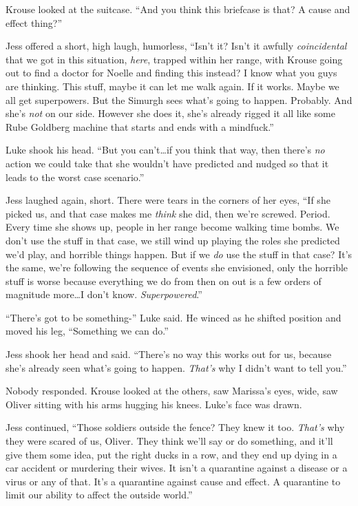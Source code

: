 Krouse looked at the suitcase.  ``And you think this briefcase is that?  A cause and effect thing?''



Jess offered a short, high laugh, humorless, ``Isn't it?  Isn't it awfully \emph{coincidental} that we got in this situation, \emph{here}, trapped within her range, with Krouse going out to find a doctor for Noelle and finding this instead?  I know what you guys are thinking.  This stuff, maybe it can let me walk again.  If it works.  Maybe we all get superpowers.  But the Simurgh sees what's going to happen.  Probably.  And she's \emph{not} on our side.  However she does it, she's already rigged it all like some Rube Goldberg machine that starts and ends with a mindfuck.''



Luke shook his head.  ``But you can't\ldots if you think that way, then there's \emph{no} action we could take that she wouldn't have predicted and nudged so that it leads to the worst case scenario.''



Jess laughed again, short.  There were tears in the corners of her eyes, ``If she picked us, and that case makes me \emph{think} she did, then we're screwed.  Period.  Every time she shows up, people in her range become walking time bombs.  We don't use the stuff in that case, we still wind up playing the roles she predicted we'd play, and horrible things happen.  But if we \emph{do} use the stuff in that case?  It's the same, we're following the sequence of events she envisioned, only the horrible stuff is worse because everything we do from then on out is a few orders of magnitude more\ldots I don't know.  \emph{Superpowered}.''



``There's got to be something-'' Luke said.  He winced as he shifted position and moved his leg, ``Something we can do.''



Jess shook her head and said.  ``There's no way this works out for us, because she's already seen what's going to happen.  \emph{That's} why I didn't want to tell you.''



Nobody responded.  Krouse looked at the others, saw Marissa's eyes, wide, saw Oliver sitting with his arms hugging his knees.  Luke's face was drawn.



Jess continued, ``Those soldiers outside the fence?  They knew it too.  \emph{That's} why they were scared of us, Oliver.  They think we'll say or do something, and it'll give them some idea, put the right ducks in a row, and they end up dying in a car accident or murdering their wives.  It isn't a quarantine against a disease or a virus or any of that.  It's a quarantine against cause and effect.  A quarantine to limit our ability to affect the outside world.''



